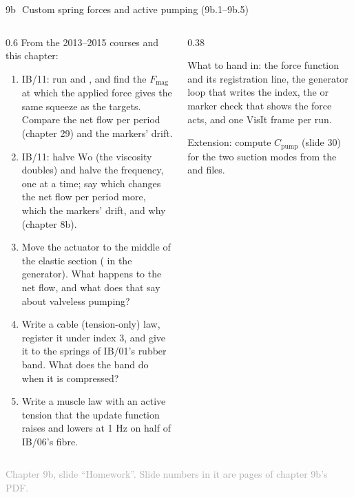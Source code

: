 \documentclass[aspectratio=169,11pt]{beamer}
\newcommand{\sourcecredit}[1]{\vfill\begin{flushright}\tiny\textcolor{DarkGray}{#1}\end{flushright}}
\begin{document}
\begin{frame}{9b\,\textbullet\ Custom spring forces and active pumping (9b.1--9b.5)}
\label{fr:c9bx1}
\begin{columns}[T,onlytextwidth]
\begin{column}{0.6\textwidth}
\footnotesize From the 2013--2015 courses and this chapter:
\begin{enumerate}
  \item[9b.1] IB/11: run  and , and find the $F_{\mathrm{mag}}$ at which the applied force gives the same squeeze as the targets. Compare the net flow per period (chapter 29) and the markers' drift.
  \item[9b.2] IB/11: halve $\mathrm{Wo}$ (the viscosity doubles) and halve the frequency, one at a time; say which changes the net flow per period more, which the markers' drift, and why (chapter 8b).
  \item[9b.3] Move the actuator to the middle of the elastic section ( in the generator). What happens to the net flow, and what does that say about valveless pumping?
  \item[9b.4] Write a cable (tension-only) law, register it under index 3, and give it to the springs of IB/01's rubber band. What does the band do when it is compressed?
  \item[9b.5] Write a muscle law with an active tension that the update function raises and lowers at 1 Hz on half of IB/06's fibre.
\end{enumerate}
\end{column}
\begin{column}{0.38\textwidth}
\begin{punchbox}
\scriptsize What to hand in: the force function and its registration line, the generator loop that writes the index, the  or marker check that shows the force acts, and one VisIt frame per run.
\end{punchbox}
\scriptsize {} Extension: compute $C_{\mathrm{pump}}$ (slide 30) for the two suction modes from the  and  files.
\end{column}
\end{columns}
\sourcecredit{Chapter 9b, slide ``Homework''. Slide numbers in it are pages of chapter 9b's PDF.}
\end{frame}
\end{document}
